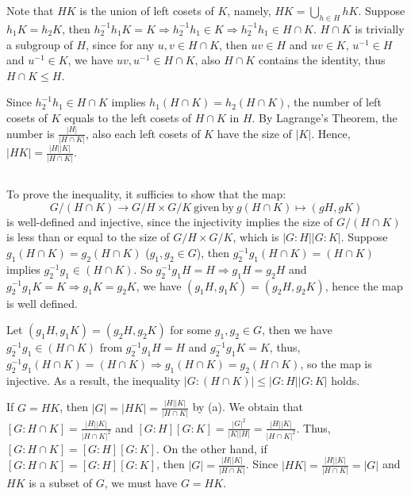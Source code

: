 \documentclass[12pt]{article}
\begin{document}
\section{}
\subsection{}
Note that $HK$ is the union of left cosets of $K$, namely, $HK=\bigcup_{h\in H}hK$. Suppose $h_1K=h_2K$, then $h_2^{-1}h_1K=K\Rightarrow h_2^{-1}h_1\in K\Rightarrow h_2^{-1}h_1\in H\cap K$. $H\cap K$ is trivially a subgroup of $H$, since for any $u,v\in H\cap K$, then $uv\in H$ and $uv\in K$, $u^{-1}\in H$ and $u^{-1}\in K$, we have $uv,u^{-1}\in H\cap K$, also $H\cap K$ contains the identity, thus $H\cap K\le H$.

Since $h_2^{-1}h_1\in H\cap K$ implies $h_1(H\cap K)=h_2(H\cap K)$, the number of left cosets of $K$ equals to the left cosets of $H\cap K$ in $H$. By Lagrange's Theorem, the number is $\frac{|H|}{|H\cap K|}$, also each left cosets of $K$ have the size of $|K|$. Hence, $|HK|=\frac{|H||K|}{|H\cap K|}$.
\subsection{}
To prove the inequality, it sufficies to show that the map:
$$G/(H\cap K)\rightarrow G/H\times G/K\mathrm{\ given\ by\ }g(H\cap K)\mapsto (gH,gK)$$
is well-defined and injective, since the injectivity implies the size of $G/(H\cap K)$ is less than or equal to the size of $G/H\times G/K$, which is $|G:H||G:K|$. Suppose $g_1(H\cap K)=g_2(H\cap K)$ ($g_1,g_2\in G$), then $g_2^{-1}g_1(H\cap K)=(H\cap K)$ implies $g_2^{-1}g_1\in(H\cap K)$. So $g_2^{-1}g_1H=H\Rightarrow g_1H=g_2H$ and $g_2^{-1}g_1K=K\Rightarrow g_1K=g_2K$, we have $(g_1H, g_1K)=(g_2H,g_2K)$, hence the map is well defined.

Let $(g_1H, g_1K)=(g_2H,g_2K)$ for some $g_1,g_2\in G$, then we have $g_2^{-1}g_1\in (H\cap K)$ from $g_2^{-1}g_1H=H$ and $g_2^{-1}g_1K=K$, thus, $g_2^{-1}g_1(H\cap K)=(H\cap K)\Rightarrow g_1(H\cap K)=g_2(H\cap K)$, so the map is injective. As a result, the inequality $|G:(H\cap K)|\le |G:H||G:K|$ holds.

If $G=HK$, then $|G|=|HK|=\frac{|H||K|}{|H\cap K|}$ by (a). We obtain that $[G:H\cap K]=\frac{|H||K|}{|H\cap K|^2}$ and $[G:H][G:K]=\frac{|G|^2}{|K||H|}=\frac{|H||K|}{|H\cap K|^2}$. Thus, $[G:H\cap K]=[G:H][G:K]$. On the other hand, if $[G:H\cap K]=[G:H][G:K]$, then $|G|=\frac{|H||K|}{|H\cap K|}$. Since $|HK|=\frac{|H||K|}{|H\cap K|}=|G|$ and $HK$ is a subset of $G$, we must have $G=HK$.
\end{document}
